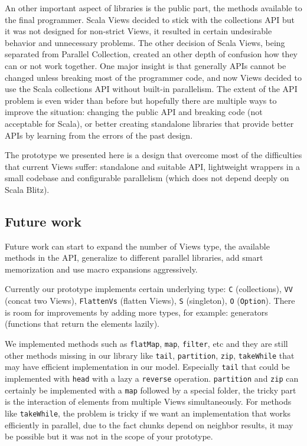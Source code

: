 \documentclass[a4paper,12pt,twocolumn]{article}
\begin{document}
An other important aspect of libraries is the public part, the methods available to the final programmer.
Scala Views decided to stick with the collections API but it was not designed for non-strict Views, it resulted in certain undesirable behavior and unnecessary problems.
The other decision of Scala Views, being separated from Parallel Collection, created an other depth of confusion how they can or not work together.
One major insight is that generally APIs cannot be changed unless breaking most of the programmer code, and now Views decided to use the Scala collections API without built-in parallelism.
The extent of the API problem is even wider than before but hopefully there are multiple ways to improve the situation: changing the public API and breaking code (not acceptable for Scala), or better creating standalone libraries that provide better APIs by learning from the errors of the past design.

The prototype we presented here is a design that overcome most of the difficulties that current Views suffer: standalone and suitable API, lightweight wrappers in a small codebase and configurable parallelism (which does not depend deeply on Scala Blitz).

\subsection{Future work}
Future work can start to expand the number of Views type, the available methods in the API, generalize to different parallel libraries, add smart memorization and use macro expansions aggressively.

Currently our prototype implements certain underlying type: \verb|C| (collections), \verb|VV| (concat two Views), \verb|FlattenVs| (flatten Views), \verb|S| (singleton), \verb|O| (\verb|Option|).
There is room for improvements by adding more types, for example: generators (functions that return the elements lazily).

We implemented methods such as \verb|flatMap|, \verb|map|, \verb|filter|, etc and they are still other methods missing in our library like \verb|tail|, \verb|partition|, \verb|zip|, \verb|takeWhile| that may have efficient implementation in our model.
Especially \verb|tail| that could be implemented with \verb|head| with a lazy a \verb|reverse| operation.
\verb|partition| and \verb|zip| can certainly be implemented with a \verb|map| followed by a special folder, the tricky part is the interaction of elements from multiple Views simultaneously.
For methods like \verb|takeWhile|, the problem is tricky if we want an implementation that works efficiently in parallel, due to the fact chunks depend on neighbor results, it may be possible but it was not in the scope of your prototype.
\end{document}
